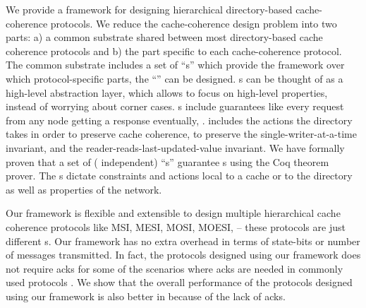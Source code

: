 We provide a framework for designing hierarchical directory-based
cache-coherence protocols. We reduce the cache-coherence design problem into two
parts: a) a common substrate shared between most directory-based cache coherence
protocols and b) the part specific to each cache-coherence protocol. The common
substrate includes a set of ``\glob{}s'' which provide the framework over which
protocol-specific parts, the ``\policy{}'' can be designed. \glob{}s can be
thought of as a high-level abstraction layer, which allows \policy{} to focus on
high-level properties, instead of worrying about corner cases. \glob{}s include
guarantees like every request from any node getting a response eventually, \etc.
\policy{} includes the actions the directory takes in order to preserve cache
coherence, \viz to preserve the single-writer-at-a-time invariant, and the
reader-reads-last-updated-value invariant. We have formally proven that a set of
(\policy{} independent) ``\local{}s'' guarantee \glob{}s using the Coq theorem
prover. The \local{}s dictate constraints and actions local to a cache or to the
directory as well as properties of the network.

Our framework is flexible and extensible to design multiple hierarchical cache
coherence protocols like MSI, MESI, MOSI, MOESI, \etc -- these protocols are
just different \policy{}s. Our framework has no extra overhead in terms of
state-bits or number of messages transmitted. In fact, the protocols designed
using our framework does not require acks for some of the scenarios where acks
are needed in commonly used protocols \cite{hammer, moesi}. We show that the
overall performance of the protocols designed using our framework is also better
in because of the lack of acks.

